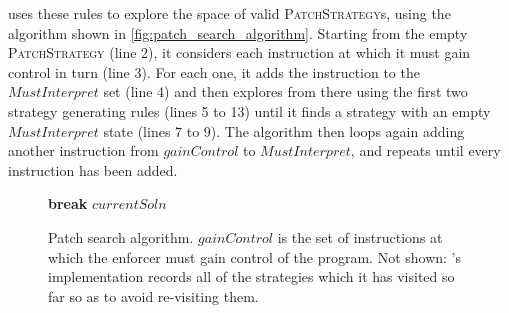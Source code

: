  {\Technique} uses these rules to explore the space of
valid \textsc{PatchStrategy}s, using the algorithm shown in
\autoref{fig:patch_search_algorithm}.  Starting from the empty
\textsc{PatchStrategy} (line 2), it considers each instruction at
which it must gain control in turn (line 3).  For each one, it adds
the instruction to the $\mathit{MustInterpret}$ set (line 4) and then
explores from there using the first two strategy generating rules
(lines 5 to 13) until it finds a strategy with an empty
$\mathit{MustInterpret}$ state (lines 7 to 9).  The algorithm then
loops again adding another instruction from $\mathit{gainControl}$ to
$\mathit{MustInterpret}$, and repeats until every instruction has been
added.

\begin{figure}
  \begin{algorithmic}[1]
      \While {\true}
          \State \textbf{break}
        \Else
        \EndIf
      \EndWhile
    \EndFor
    \State \Return $\mathit{currentSoln}$
    \EndProcedure
  \end{algorithmic}
  \caption{Patch search algorithm.  $\mathit{gainControl}$ is the set
    of instructions at which the enforcer must gain control of the
    program.  Not shown: {\implementation}'s implementation records
    all of the strategies which it has visited so far so as to avoid
    re-visiting them.}
  \label{fig:patch_search_algorithm}
\end{figure}

